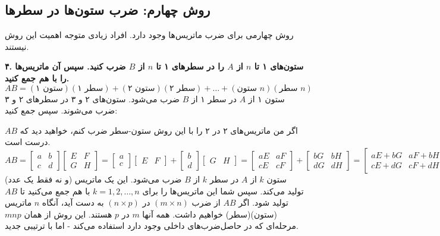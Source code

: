\documentclass[12pt, a4paper]{book}
\begin{document}
	\subsection*{روش چهارم: ضرب ستون‌ها در سطرها}
	روش چهارمی برای ضرب ماتریس‌ها وجود دارد. افراد زیادی متوجه اهمیت این روش نیستند.
	
	\textbf{۴. ستون‌های ۱ تا $n$ از $A$ را در سطرهای ۱ تا $n$ از $B$ ضرب کنید. سپس آن ماتریس‌ها را با هم جمع کنید.}
	\[ AB = (\text{ستون ۱})(\text{سطر ۱}) + (\text{ستون ۲})(\text{سطر ۲}) + \dots + (\text{ستون } n)(\text{سطر } n) \]
	ستون ۱ از $A$ در سطر ۱ از $B$ ضرب می‌شود. ستون‌های ۲ و ۳ در سطرهای ۲ و ۳ ضرب می‌شوند. سپس جمع کنید:
	
	اگر من ماتریس‌های ۲ در ۲ را با این روش ستون-سطر ضرب کنم، خواهید دید که $AB$ درست است.
	\[
	AB = \begin{bmatrix} a & b \\ c & d \end{bmatrix} \begin{bmatrix} E & F \\ G & H \end{bmatrix}
	= \begin{bmatrix} a \\ c \end{bmatrix} \begin{bmatrix} E & F \end{bmatrix} + \begin{bmatrix} b \\ d \end{bmatrix} \begin{bmatrix} G & H \end{bmatrix}
	= \begin{bmatrix} aE & aF \\ cE & cF \end{bmatrix} + \begin{bmatrix} bG & bH \\ dG & dH \end{bmatrix}
	= \begin{bmatrix} aE+bG & aF+bH \\ cE+dG & cF+dH \end{bmatrix} \quad (۳)
	\]
	ستون $k$ از $A$ در سطر $k$ از $B$ ضرب می‌شود. این یک ماتریس (و نه فقط یک عدد) تولید می‌کند. سپس شما این ماتریس‌ها را برای $k=1, 2, \dots, n$ با هم جمع می‌کنید تا $AB$ تولید شود. اگر $AB$ از ضرب $(m \times n)$ در $(n \times p)$ به دست آید، آنگاه $n$ ماتریس (ستون)(سطر) خواهیم داشت. همه آنها $m$ در $p$ هستند. این روش از همان $mnp$ مرحله‌ای که در حاصل‌ضرب‌های داخلی وجود دارد استفاده می‌کند - اما با ترتیبی جدید.
	
\end{document}

